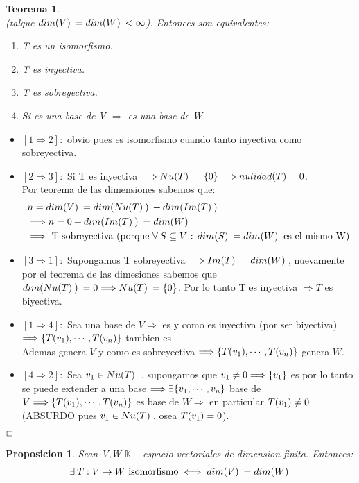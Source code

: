 \documentclass[]{article}
\newtheorem{theorem}{Teorema}
\newtheorem{proposition}{Proposicion}[theorem]
\newenvironment{proof}{\noindent{\bf Prueba:}}{$\hfill \Box$ \vspace{10pt}}
\newcommand{\K}{
    \mathbb{K}
}
\newcommand{\ida}{\Longrightarrow}
\begin{document}
\begin{theorem}
    \\
    (talque $\text{$dim(V)$}\:=\text{$dim(W)$}\:<\infty$). Entonces son equivalentes:
    \begin{enumerate}
        \item T es un isomorfismo.
        \item T es inyectiva.
        \item T es sobreyectiva.
        \item Si  es una base de V $\ida$  es una base de W.
    \end{enumerate}
\end{theorem}
\begin{proof}
    \begin{itemize}
        \item $[1 \ida 2]:$ obvio pues es isomorfismo cuando tanto inyectiva como sobreyectiva.
        \item $[2 \ida 3]:$ Si T es inyectiva $\ida \N=\conjunto{0}\ida nulidad(T)=0$.\\
        Por teorema de las dimensiones sabemos que:
        \begin{align*}
            &n=\dm{V}=\dm{\N}+\dm{\I}\\
            &\ida n = 0 + \dm{\I} = \dm{W}\\
            &\ida \text{ T sobreyectiva (porque $\forall\: \incluye{S}{V}$ : $\dm{S}=\dm{W}$ es el mismo W)}
        \end{align*}
        \item $[3 \ida 1]:$ Supongamos T sobreyectiva $\ida\I=\dm{W}$, nuevamente por el teorema de las dimesiones
        sabemos que $\dm{\N}=0 \ida \N=\conjunto{0}$. Por lo tanto T es inyectiva $\ida T$ es biyectiva.
        \item $[1 \ida 4]:$ Sea  una base de $V \ida$  es \li
        y como es inyectiva (por ser biyectiva) $\ida \conjunto{\T{v_1},\cdots,\T{v_n}}$ tambien es \li\\
        Ademas  genera $V$ y como es sobreyectiva $\ida \conjunto{\T{v_1},\cdots,\T{v_n}}$
        genera $W$.
        \item $[4 \ida 2]:$ Sea $\text{$v_{1}$} \in \text{$Nu(T)$}\:$ , supongamos que $\vc{1}\neq0 \ida \conjunto{\vc{1}}$ es \li por lo tanto
        se puede extender a una base $\ida \exists \conjunto{\vc{1},\cdots,\vc{n}}$ base de $V
        \ida \conjunto{\T{\vc{1}},\cdots,\T{\vc{n}}}$ es base de $W \ida$ en particular $\text{$T({\text{$v_{1}$}})$}\neq0$ \:
        (ABSURDO pues $\text{$v_{1}$}\in\text{$Nu(T)$}\:$, osea $\text{$T({\text{$v_{1}$}})$}=0$).
    \end{itemize}
\end{proof}
\begin{proposition}
    Sean V,W $\K-$espacio vectoriales de dimension finita. Entonces:
    \begin{align*}
        \exists\: T:V\to W \text{  isomorfismo} \iff \text{$dim(V)$}\:=\text{$dim(W)$}\:
    \end{align*}
\end{proposition}
\end{document}
